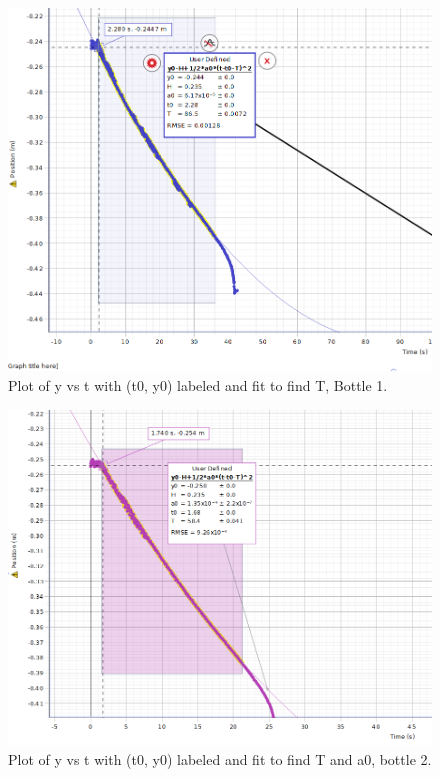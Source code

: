 \documentclass[12pt]{article}
\begin{document}
        \begin{figure}[H]
            \centering
            \includegraphics[width=0.9\linewidth]{y1.png}
            \caption{Plot of y vs t with (t0, y0) labeled and fit to find T, Bottle 1.}
        \end{figure}
        \begin{figure}[H]
            \centering
            \includegraphics[width=0.9\linewidth]{y2.png}
            \captionsetup{justification=centering}
            \caption{Plot of y vs t with (t0, y0) labeled and fit to find T and a0, bottle 2.}
        \end{figure}
\end{document}
